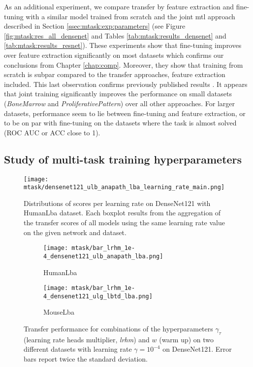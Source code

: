 As an additional experiment, we compare transfer by feature extraction and fine-tuning with a similar model trained from scratch and the joint \acrshort{mtl} approach described in Section \ref{ssec:mtask:exp:parameters} (see Figure \ref{fig:mtask:res_all_densenet} and Tables \ref{tab:mtask:results_densenet} and
\ref{tab:mtask:results_resnet}). These experiments show that fine-tuning improves over feature extraction significantly on most datasets which confirms our conclusions from Chapter \ref{chap:comp}. Moreover, they show that training from scratch is subpar compared to the transfer approaches, feature extraction included. This last observation confirms previously published results \cite{ponzio2019dealing, tajbakhsh2016convolutional,shin2016deep}. It appears that joint training significantly improves the performance on small datasets (\textit{BoneMarrow} and \textit{ProliferativePattern}) over all other approaches. For larger datasets, performance seem to lie between fine-tuning and feature extraction, or to be on par with fine-tuning on the datasets where the task is almost solved (ROC AUC or ACC close to 1). 

\subsection{Study of multi-task training hyperparameters}
\label{ssec:mtask:hyperparameters}

\begin{figure}[t]
    \centering
    \texttt{[image: mtask/densenet121\_ulb\_anapath\_lba\_learning\_rate\_main.png]}
    \caption{Distributions of scores per learning rate on DenseNet121 with HumanLba dataset. Each boxplot results from the aggregation of the transfer scores of all models using the same learning rate value on the given network and dataset.}
    \label{fig:mtask:lr_effect}
\end{figure}

\begin{figure}[t]
    \centering
    \begin{subfigure}[t]{0.70\textwidth}
        \centering
        \texttt{[image: mtask/bar\_lrhm\_1e-4\_densenet121\_ulb\_anapath\_lba.png]}
        \caption{HumanLba}
    \end{subfigure}    
    \begin{subfigure}[t]{0.70\textwidth}
        \centering
        \texttt{[image: mtask/bar\_lrhm\_1e-4\_densenet121\_ulg\_lbtd\_lba.png]}
        \caption{MouseLba}
    \end{subfigure}    
    \caption{Transfer performance for combinations of the hyperparameters $\gamma_\tau$ (learning rate heads multiplier, \textit{lrhm}) and $w$ (warm up) on two different datasets with learning rate $\gamma = 10^{-4}$ on DenseNet121. Error bars report twice the standard deviation.}
    \label{fig:mtask:hyper_other_effect}
\end{figure}

